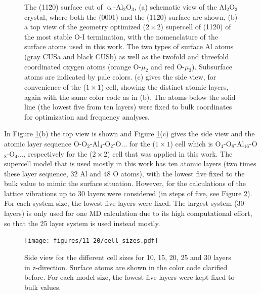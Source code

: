 \documentclass[11pt,DIV=13,BCOR=5mm,a4paper,headinclude]{scrbook}
\begin{document}
\begin{figure}[!h]
             \caption{The (11\=20) surface cut of $\upalpha$-Al$_2$O$_3$, (a) schematic view of the Al$_2$O$_3$ crystal, where both the (0001) and the (11\=20) surface are shown, (b) a top view of the geometry optimized ($2\times 2$) supercell of (11\=20) of the most stable O-I termination, with the nomenclature of the surface atoms used in this work.
The two types of surface Al atoms (gray CUSa and black CUSb) as well as the twofold and threefold coordinated oxygen atoms (orange O-$\mu_2$ and red O-$\mu_3$).
Subsurface atoms are indicated by pale colors.
(c) gives the side view, for convenience of the ($1\times 1$) cell, showing the distinct atomic layers, again with the same color code as in (b).
The atoms below the solid line (the lowest five from ten layers) were fixed to bulk coordinates for optimization and frequency analyses.
}
            \label{abb:crystal_11-20}
\end{figure}
In Figure \ref{abb:crystal_11-20}(b) the top view is shown and Figure \ref{abb:crystal_11-20}(c) gives the side view and the atomic layer sequence O-O$_2$-Al$_4$-O$_2$-O$\ldots$ for the ($1\times 1$) cell which is O$_4$-O$_8$-Al$_{16}$-O$_8$-O$_4\ldots$, respectively for the ($2\times 2$) cell that was applied in this work.
The supercell model that is used mostly in this work has ten atomic layers (two times these layer sequence, 32 Al and 48 O atoms), with the lowest five fixed to the bulk value to mimic the surface situation.
However, for the calculations of the lattice vibrations up to 30 layers were considered (in steps of five, see Figure \ref{abb:cell_sizes}).
For each system size, the lowest five layers were fixed.
The largest system (30 layers) is only used for one MD calculation due to its high computational effort, so that the 25 layer system is used instead mostly.
\begin{figure}[!h]
    \centering
    \texttt{[image: figures/11-20/cell\_sizes.pdf]}
             \caption{Side view for the different cell sizes for 10, 15, 20, 25 and 30 layers in z-direction.
Surface atoms are shown in the color code clarified before.
For each model size, the lowest five layers were kept fixed to bulk values.}
            \label{abb:cell_sizes}
\end{figure}
\end{document}
